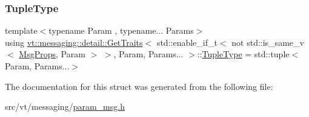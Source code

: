 \subsubsection{\texorpdfstring{Tuple\+Type}{TupleType}}
{\footnotesize\ttfamily template$<$typename Param , typename... Params$>$ \\
using \hyperlink{structvt_1_1messaging_1_1detail_1_1_get_traits}{vt\+::messaging\+::detail\+::\+Get\+Traits}$<$ std\+::enable\+\_\+if\+\_\+t$<$ not std\+::is\+\_\+same\+\_\+v$<$ \hyperlink{structvt_1_1_msg_props}{Msg\+Props}, Param $>$ $>$, Param, Params... $>$\+::\hyperlink{structvt_1_1messaging_1_1detail_1_1_get_traits_3_01std_1_1enable__if__t_3_01not_01std_1_1is__sam2b64ee26a7e98c8a0d5e4010ea831954_a7bc98b72e7b33a5698bfde515f5941b9}{Tuple\+Type} =  std\+::tuple$<$Param, Params...$>$}



The documentation for this struct was generated from the following file\+:\begin{DoxyCompactItemize}
\item 
src/vt/messaging/\hyperlink{param__msg_8h}{param\+\_\+msg.\+h}\end{DoxyCompactItemize}
